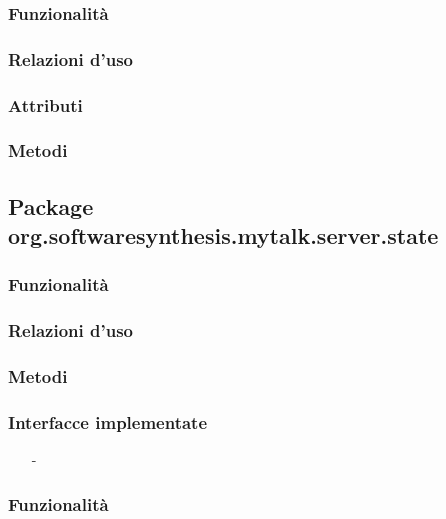 \subsubsection*{Funzionalità}

\subsubsection*{Relazioni d'uso}

\subsubsection*{Attributi}

\subsubsection*{Metodi}

\subsection{Package org.softwaresynthesis.mytalk.server.state}\label{sec:state}


\subsubsection*{Funzionalità}

\subsubsection*{Relazioni d'uso}

\subsubsection*{Metodi}


\subsubsection*{Interfacce implementate}
\begin{itemize}[noitemsep,nolistsep]
  \item[-] 
\end{itemize}

\subsubsection*{Funzionalità}


